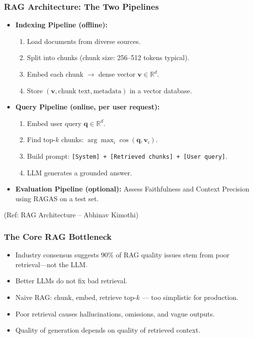 \begin{frame}[fragile]\frametitle{RAG Architecture: The Two Pipelines}

\begin{itemize}
  \item \textbf{Indexing Pipeline (offline):}
  \begin{enumerate}
    \item Load documents from diverse sources.
    \item Split into chunks (chunk size: 256--512 tokens typical).
    \item Embed each chunk $\rightarrow$ dense vector $\mathbf{v} \in \mathbb{R}^d$.
    \item Store $(\mathbf{v}, \text{chunk text}, \text{metadata})$ in a vector database.
  \end{enumerate}

  \item \textbf{Query Pipeline (online, per user request):}
  \begin{enumerate}
    \item Embed user query $\mathbf{q} \in \mathbb{R}^d$.
    \item Find top-$k$ chunks: $\arg\max_i \cos(\mathbf{q}, \mathbf{v}_i)$.
    \item Build prompt: \texttt{[System] + [Retrieved chunks] + [User query]}.
    \item LLM generates a grounded answer.
  \end{enumerate}

  \item \textbf{Evaluation Pipeline (optional):}
  Assess Faithfulness and Context Precision using RAGAS on a test set.
\end{itemize}

{\tiny (Ref: RAG Architecture -- Abhinav Kimothi)}

\end{frame}

\begin{frame}[fragile]\frametitle{The Core RAG Bottleneck}
      \begin{itemize}
        \item Industry consensus suggests 90\% of RAG quality issues stem from poor retrieval---not the LLM.
        \item Better LLMs do not fix bad retrieval.
        \item Naive RAG: chunk, embed, retrieve top-$k$ --- too simplistic for production.
        \item Poor retrieval causes hallucinations, omissions, and vague outputs.
        \item Quality of generation depends on quality of retrieved context.
      \end{itemize}
\end{frame}

